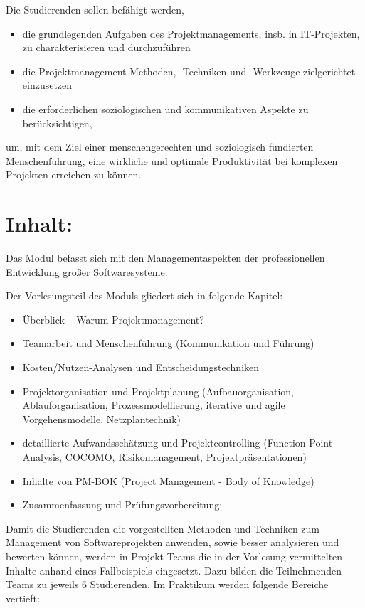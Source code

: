 Die Studierenden sollen befähigt werden,

\begin{itemize}
\tightlist
\item
  die grundlegenden Aufgaben des Projektmanagements, insb. in
  IT-Projekten, zu charakterisieren und durchzuführen
\item
  die Projektmanagement-Methoden, -Techniken und -Werkzeuge
  zielgerichtet einzusetzen
\item
  die erforderlichen soziologischen und kommunikativen Aspekte zu
  berücksichtigen,
\end{itemize}

um, mit dem Ziel einer menschengerechten und soziologisch fundierten
Menschenführung, eine wirkliche und optimale Produktivität bei komplexen
Projekten erreichen zu können.

\section*{Inhalt:}\label{inhalt-20}

Das Modul befasst sich mit den Managementaspekten der professionellen
Entwicklung großer Softwaresysteme.

Der Vorlesungsteil des Moduls gliedert sich in folgende Kapitel:

\begin{itemize}
\tightlist
\item
  Überblick -- Warum Projektmanagement?
\item
  Teamarbeit und Menschenführung (Kommunikation und Führung)
\item
  Kosten/Nutzen-Analysen und Entscheidungstechniken
\item
  Projektorganisation und Projektplanung (Aufbauorganisation,
  Ablauforganisation, Prozessmodellierung, iterative und agile
  Vorgehensmodelle, Netzplantechnik)
\item
  detaillierte Aufwandsschätzung und Projektcontrolling (Function Point
  Analysis, COCOMO, Risikomanagement, Projektpräsentationen)
\item
  Inhalte von PM-BOK (Project Management - Body of Knowledge)
\item
  Zusammenfassung und Prüfungsvorbereitung;
\end{itemize}

Damit die Studierenden die vorgestellten Methoden und Techniken zum
Management von Softwareprojekten anwenden, sowie besser analysieren und
bewerten können, werden in Projekt-Teams die in der Vorlesung
vermittelten Inhalte anhand eines Fallbeispiels eingesetzt. Dazu bilden
die Teilnehmenden Teams zu jeweils 6 Studierenden. Im Praktikum werden
folgende Bereiche vertieft:

